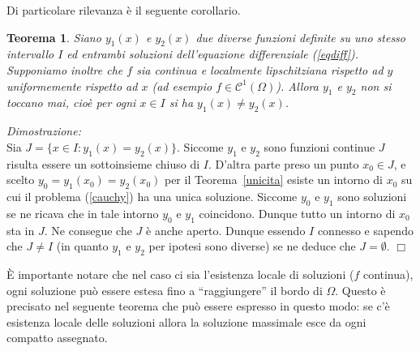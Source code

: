 \documentclass[italian,a4paper]{article}
\newcommand{\CC}{\mathcal{C}}
\newtheorem{theorem}{Teorema}[section]
\def\profname{Dimostrazione}
\newenvironment{proof}
        {%
                {}%
                {%
                }%
        \noindent%
        {\it \profname:}\\%
        }%
        {%
        \hfill $\Box$%
        }
\begin{document}
Di particolare rilevanza \`e il seguente corollario.
\begin{theorem}\label{nontocca}
Siano $y_1(x)$ e $y_2(x)$ due diverse funzioni definite su uno stesso
intervallo $I$ ed entrambi soluzioni dell'equazione differenziale
(\ref{eqdiff}). Supponiamo inoltre che $f$ sia continua e localmente
lipschitziana rispetto ad $y$ uniformemente rispetto ad $x$ (ad
esempio $f\in\CC^1(\Omega)$). Allora $y_1$ e $y_2$ non si toccano mai,
cio\`e per ogni $x\in I$ si ha $y_1(x)\neq y_2(x)$. 
\end{theorem} 
\begin{proof}
Sia $J=\{x\in I: y_1(x)=y_2(x)\}$. Siccome $y_1$ e $y_2$ sono funzioni
continue $J$ risulta essere un sottoinsieme chiuso di $I$. D'altra
parte preso un punto $x_0\in J$, e scelto $y_0=y_1(x_0)=y_2(x_0)$ per
il Teorema~\ref{unicita} esiste un intorno di $x_0$ su cui il problema
(\ref{cauchy}) ha una unica soluzione. Siccome $y_0$ e $y_1$ sono
soluzioni se ne ricava che in tale intorno $y_0$ e $y_1$
coincidono. Dunque tutto un intorno di $x_0$ sta in $J$. Ne consegue
che $J$ \`e anche aperto. Dunque essendo $I$ connesso e sapendo che
$J\neq I$ (in quanto $y_1$ e $y_2$ per ipotesi sono diverse) se ne
deduce che $J=\emptyset$.
\end{proof}

\`E importante notare che nel caso ci sia l'esistenza locale di
soluzioni ($f$ continua), ogni soluzione pu\`o essere estesa fino a
``raggiungere'' il bordo di $\Omega$. Questo \`e precisato nel
seguente teorema che pu\`o essere espresso in questo modo: se c'\`e
esistenza locale delle soluzioni allora la soluzione massimale esce da
ogni compatto assegnato.
\end{document}
